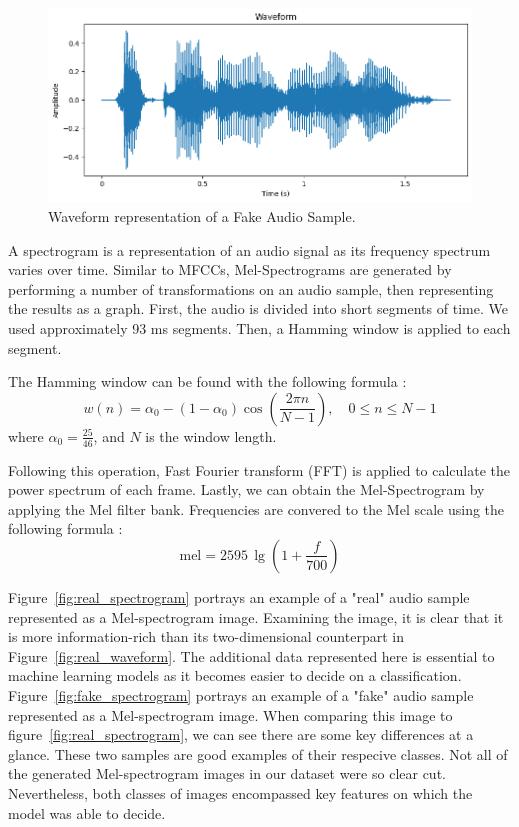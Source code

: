 \documentclass[sigconf,authordraft]{acmart}
\begin{document}
\begin{figure}
  \centering
  \includegraphics[width=\linewidth]{images/fake_waveform.png}
  \caption{Waveform representation of a Fake Audio Sample.}
  \label{fig:fake_waveform}
\end{figure}

A spectrogram is a representation of an audio signal as its frequency spectrum varies over time. Similar to MFCCs, Mel-Spectrograms are generated by performing a number of transformations on an audio sample, then representing the results as a graph. First, the audio is divided into short segments of time. We used approximately 93 ms segments. Then, a Hamming window is applied to each segment.

The Hamming window can be found with the following formula \cite{9252126}:
\begin{equation}
w(n) = \alpha_0 - (1 - \alpha_0) \cos\left(\frac{2\pi n}{N-1}\right), \quad 0 \leq n \leq N-1
\end{equation}
where \(\alpha_0 = \frac{25}{46}\), and \(N\) is the window length.

Following this operation, Fast Fourier transform (FFT) is applied to calculate the power spectrum of each frame. Lastly, we can obtain the Mel-Spectrogram by applying the Mel filter bank. Frequencies are convered to the Mel scale using the following formula \cite{9252126}:
\begin{equation}
\text{mel} = 2595 \, \lg\left(1 + \frac{f}{700}\right)
\end{equation}

Figure~\ref{fig:real_spectrogram} portrays an example of a "real" audio sample represented as a Mel-spectrogram image. Examining the image, it is clear that it is more information-rich than its two-dimensional counterpart in Figure~\ref{fig:real_waveform}. The additional data represented here is essential to machine learning models as it becomes easier to decide on a classification. Figure~\ref{fig:fake_spectrogram} portrays an example of a "fake" audio sample represented as a Mel-spectrogram image. When comparing this image to figure~\ref{fig:real_spectrogram}, we can see there are some key differences at a glance. These two samples are good examples of their respecive classes. Not all of the generated Mel-spectrogram images in our dataset were so clear cut. Nevertheless, both classes of images encompassed key features on which the model was able to decide. 
\end{document}
